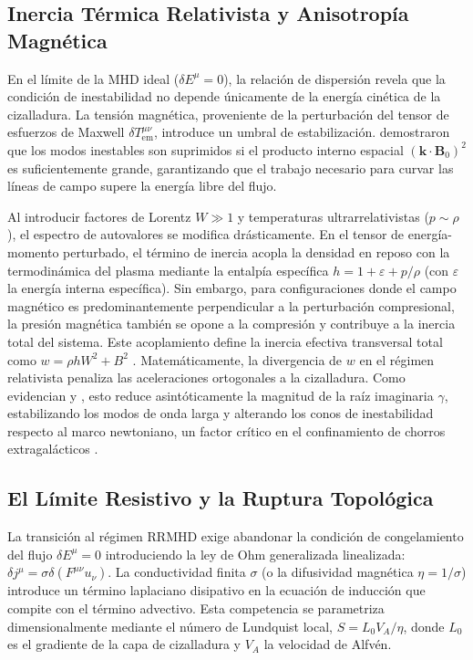 \subsection{Inercia Térmica Relativista y Anisotropía Magnética}
\label{sec:KHI_lineal_anisotropia}

\primerparrafo En el límite de la MHD ideal ($\delta E^\mu = 0$), la relación de dispersión revela que la condición de inestabilidad no depende únicamente de la energía cinética de la cizalladura. La tensión magnética, proveniente de la perturbación del tensor de esfuerzos de Maxwell $\delta T^{\mu\nu}_{\text{em}}$, introduce un umbral de estabilización. \textcite{goedbloed-2004A, osmanov-2008, chow2023} demostraron que los modos inestables son suprimidos si el producto interno espacial $(\mathbf{k} \cdot \mathbf{B}_0)^2$ es suficientemente grande, garantizando que el trabajo necesario para curvar las líneas de campo supere la energía libre del flujo.

Al introducir factores de Lorentz $W \gg 1$ y temperaturas ultrarrelativistas ($p \sim \rho$), el espectro de autovalores se modifica drásticamente. En el tensor de energía-momento perturbado, el término de inercia acopla la densidad en reposo con la termodinámica del plasma mediante la entalpía específica $h = 1 + \varepsilon + p/\rho$ (con $\varepsilon$ la energía interna específica). Sin embargo, para configuraciones donde el campo magnético es predominantemente perpendicular a la perturbación compresional, la presión magnética también se opone a la compresión y contribuye a la inercia total del sistema. Este acoplamiento define la inercia efectiva transversal total como $w = \rho h W^2 + B^2$ \parencite{chow2023}. Matemáticamente, la divergencia de $w$ en el régimen relativista penaliza las aceleraciones ortogonales a la cizalladura. Como evidencian \textcite{osmanov-2008} y \textcite{pimentel-2019}, esto reduce asintóticamente la magnitud de la raíz imaginaria $\gamma$, estabilizando los modos de onda larga y alterando los conos de inestabilidad respecto al marco newtoniano, un factor crítico en el confinamiento de chorros extragalácticos \parencite{bucciantini-2006}.


\subsection{El Límite Resistivo y la Ruptura Topológica}

\primerparrafo La transición al régimen RRMHD exige abandonar la condición de congelamiento del flujo $\delta E^\mu = 0$ introduciendo la ley de Ohm generalizada linealizada: $\delta j^\mu = \sigma \delta (F^{\mu\nu}u_\nu)$. La conductividad finita $\sigma$ (o la difusividad magnética $\eta = 1/\sigma$) introduce un término laplaciano disipativo en la ecuación de inducción que compite con el término advectivo. Esta competencia se parametriza dimensionalmente mediante el número de Lundquist local, $S = L_0 V_A / \eta$, donde $L_0$ es el gradiente de la capa de cizalladura y $V_A$ la velocidad de Alfvén.

